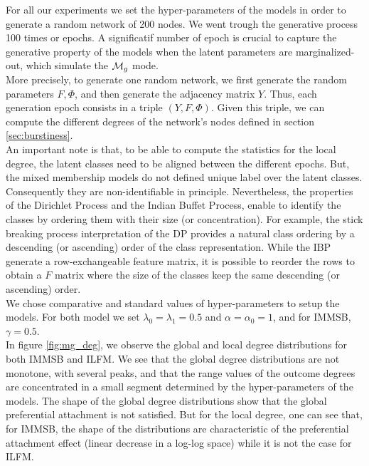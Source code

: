 For all our experiments we set the hyper-parameters of the models in order to generate a random network of 200 nodes. We went trough the generative process 100 times or epochs. A significatif number of epoch is crucial to capture the generative property of the models when the latent parameters are marginalized-out, which simulate the $\mathcal{M}_g$ mode.~\\

More precisely, to generate one random network, we first generate the random parameters $F, \Phi$, and then generate the adjacency matrix $Y$. Thus, each generation epoch consists in a triple $(Y, F, \Phi)$. Given this triple, we can compute the different degrees of the network's nodes defined in section \ref{sec:burstiness}.~\\

An important note is that, to be able to compute the statistics for the local degree, the latent classes need to be aligned between the different epochs. But, the mixed membership models do not defined unique label over the latent classes. Consequently they are non-identifiable in principle. Nevertheless, the properties of the Dirichlet Process and the Indian Buffet Process, enable to identify the classes by ordering them with their size (or concentration). For example, the stick breaking process interpretation of the DP provides a natural class ordering by a descending (or ascending) order of the class representation. While the IBP generate a row-exchangeable feature matrix, it is possible to reorder the rows to obtain a $F$ matrix where the size of the classes keep the same descending (or ascending) order.~\\

We chose comparative and standard values of hyper-parameters to setup the models. For both model we set $\lambda_0=\lambda_1=0.5$ and $\alpha=\alpha_0=1$, and for IMMSB, $\gamma=0.5$.~\\

In figure \ref{fig:mg_deg}, we observe the global and local degree distributions for both IMMSB and ILFM. We see that the global degree distributions are not monotone, with several peaks, and that the range values of the outcome degrees are concentrated in a small segment determined by the hyper-parameters of the models. The shape of the global degree distributions show that the global preferential attachment is not satisfied. But for the local degree, one can see that, for IMMSB, the shape of the distributions are characteristic of the preferential attachment effect (linear decrease in a log-log space) while it is not the case for ILFM. %
~\\

